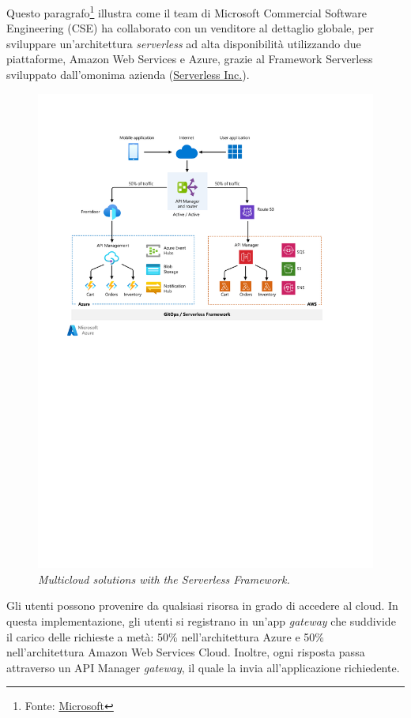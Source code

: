 \documentclass[a4paper]{article}
\begin{document}
	Questo paragrafo\footnote{Fonte: \href{https://learn.microsoft.com/en-us/azure/architecture/example-scenario/serverless/serverless-multicloud}{Microsoft}} illustra come il team di Microsoft Commercial Software Engineering (CSE) ha collaborato con un venditore al dettaglio globale, per sviluppare un'architettura \emph{serverless} ad alta disponibilità utilizzando due piattaforme, Amazon Web Services e Azure, grazie al Framework Serverless sviluppato dall'omonima azienda (\href{https://www.serverless.com/about}{Serverless Inc.}).
	\begin{figure}[!htp]
		\centering
		\includegraphics[width=\textwidth]{img/multi-cloud-serverless-architecture.pdf}
		\caption{\emph{Multicloud solutions with the Serverless Framework.}}
	\end{figure}
	
	\noindent
	Gli utenti possono provenire da qualsiasi risorsa in grado di accedere al cloud. In questa implementazione, gli utenti si registrano in un'app \emph{gateway} che suddivide il carico delle richieste a metà: 50\% nell'architettura Azure e 50\% nell'architettura Amazon Web Services Cloud. Inoltre, ogni risposta passa attraverso un API Manager \emph{gateway}, il quale la invia all'applicazione richiedente.\newpage
	
\end{document}
